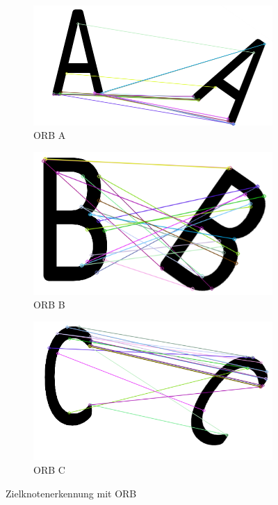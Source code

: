 \begin{figure}[H]
\centering
\begin{subfigure}{0.3\textwidth}
\centering
\includegraphics[width=0.95\linewidth]{assets/informatik-prototyp/opencv/target_node_detection/orb-a.png} 
\caption{ORB A}
\label{fig:orb-a}
\end{subfigure}
\begin{subfigure}{0.3\textwidth}
\centering
\includegraphics[width=0.95\linewidth]{assets/informatik-prototyp/opencv/target_node_detection/orb-b.png} 
\caption{ORB B}
\label{fig:orb-b}
\end{subfigure}
\begin{subfigure}{0.3\textwidth}
\centering
\includegraphics[width=0.95\linewidth]{assets/informatik-prototyp/opencv/target_node_detection/orb-c.png} 
\caption{ORB C}
\label{fig:orb-c}
\end{subfigure}

\caption{Zielknotenerkennung mit ORB}
\label{fig:orb-zielknoten}
\end{figure}


